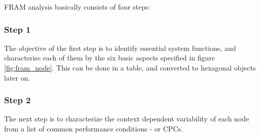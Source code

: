 FRAM analysis basically consists of four steps:

\subsubsection*{Step 1}
The objective of the first step is to identify essential system functions, and characterise each of them by the six basic aspects specified in figure \ref{fig:fram_node}. This can be done in a table, and converted to hexagonal objects later on.
\subsubsection*{Step 2}
The next step is to characterize the context dependent variability of each node from a list of common performance conditions - or CPCs. 



